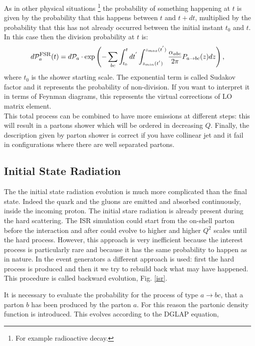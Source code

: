As in other physical situations \footnote{For example radioactive decay.} the probability of something happening at $ t $ is given by the probability that this happens between $ t $ and $ t + dt $, multiplied by the probability that this has not already occurred between the initial instant $ t_0 $ and $ t $.
In this case then the  division probability  at $ t $ is:
\begin{equation}
 d \mathcal{P}_{a}^{\mbox{\footnotesize{FSR}}}(t)=   d \mathcal{P}_{a} \cdot \mbox{exp} \left(   -\sum_{bc} \int_{t_0}^t dt^{'}  \int_{z_{min}(t^{'})}^{{z_{max}(t^{'})}} \frac{\alpha_{abc}}{2 \pi} P_{a \rightarrow bc}(z) dz \right) \mbox{,}\end{equation}
where $t_{0}$ is the shower starting scale. 
The exponential term is called Sudakov factor and it represents the probability of non-division. 
If you want to interpret it in terms of Feynman diagrams, this represents the virtual corrections of LO matrix element. \\
This total process can be combined to have more emissions at different steps: this will result in a partons  shower which will be ordered in decreasing $ Q $. 
Finally,  the description given by parton shower is correct if you have collinear jet and it fail in configurations where there are well separated partons.   

\subsection*{Initial State Radiation}
The   the initial state radiation evolution is much more complicated than the final state. 
Indeed the quark and the gluons are   emitted  and absorbed continuously, inside the incoming proton. The initial stare radiation is already present during the hard scattering.
The ISR simulation could start from the on-shell parton before the interaction and after  could evolve to higher and higher $ Q ^ 2 $ scales until the hard process.
However, this approach is very inefficient because the  interest process  is particularly rare and because  it has the same probability to happen as in nature. 
In the event generators a different approach is  used: first the hard process is produced and then it we try to rebuild back what may have happened. 
This procedure is called backward evolution, Fig. \ref{isr}.

It is necessary to evaluate the  probability for the process of type $ a \rightarrow bc $,  that a parton $ b $ has  been produced by the parton $ a $.
For this reason the  partonic density function is introduced.  This evolves according to the DGLAP \cite{Altarelli: 1977zs} equation,

